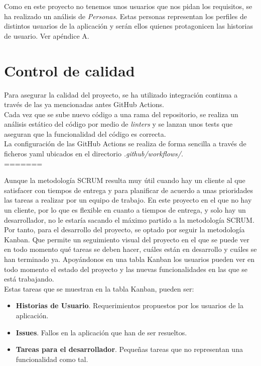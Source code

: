 
Como en este proyecto no tenemos unos usuarios que nos pidan los requisitos, se ha realizado un análisis de \textit{Personas}\cite{personas}. Estas personas representan los perfiles de distintos usuarios de la aplicación y serán ellos quienes protagonicen las historias de usuario. Ver apéndice A.

\section{Control de calidad}
Para asegurar la calidad del proyecto, se ha utilizado integración continua a través de las ya mencionadas antes GitHub Actions.\\

Cada vez que se sube nuevo código a una rama del repositorio, se realiza un análisis estático del código por medio de \textit{linters} y se lanzan unos tests que aseguran que la funcionalidad del código es correcta.\\

La configuración de las GitHub Actions se realiza de forma sencilla a través de ficheros yaml ubicados en el directorio \textit{.github/workflows/}.\\



=======

Aunque la metodología SCRUM resulta muy útil cuando hay un cliente al que satisfacer con tiempos de entrega y para planificar de acuerdo a unas prioridades las tareas a realizar por un equipo de trabajo. En este proyecto en el que no hay un cliente, por lo que es flexible en cuanto a tiempos de entrega, y solo hay un desarrollador, no le estaría sacando el máximo partido a la metodología SCRUM.\\

Por tanto, para el desarrollo del proyecto, se optado por seguir la metodología Kanban. Que permite un seguimiento visual del proyecto en el que se puede ver en todo momento qué tareas se deben hacer, cuáles están en desarrollo y cuáles se han terminado ya. Apoyándonos en una tabla Kanban los usuarios pueden ver en todo momento el estado del proyecto y las nuevas funcionalidades en las que se está trabajando. \\

Estas tareas que se muestran en la tabla Kanban, pueden ser:
\begin{itemize}
    \item \textbf{Historias de Usuario}. Requerimientos propuestos por los usuarios de la aplicación.
    \item \textbf{Issues}. Fallos en la aplicación que han de ser resueltos.
    \item \textbf{Tareas para el desarrollador}. Pequeñas tareas que no representan una funcionalidad como tal.
\end{itemize}

